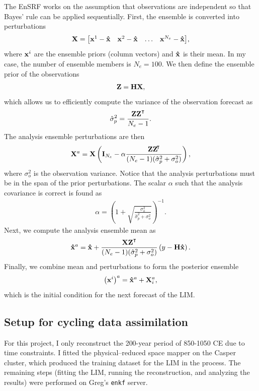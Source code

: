 \documentclass[parskip=half,DIV=16]{scrartcl}
\begin{document}
The \gls{EnSRF} works on the assumption that observations are independent so that Bayes' rule can be applied sequentially. First, the ensemble is converted into perturbations
\begin{align*}
    \vb{X} = \mqty[ \vb{x}^{1} - \vu{x} &  \vb{x}^{2} - \vu{x} & \ldots &  \vb{x}^{N_e} - \vu{x} ],
\end{align*}
where $\vb{x}^i$ are the ensemble priors (column vectors) and $\vu{x}$ is their mean. In my case, the number of ensemble members is $N_e = 100$. We then define the ensemble prior of the observations
\begin{align*}
    \vb{Z} = \vb{H} \vb{X},
\end{align*}
which allows us to efficiently compute the variance of the observation forecast as
\begin{align*}
    \hat{\sigma}_p^2 = \frac{\vb{Z} \vb{Z}^\transpose}{N_e-1}.
\end{align*}
The analysis ensemble perturbations are then
\begin{align*}
    \vb{X}^a = \vb{X} \left( \vb{I}_{N_e} - \alpha \frac{\vb{Z} \vb{Z}^\transpose*}{(N_e-1)(\hat{\sigma}_p^2 + \sigma_o^2)} \right),
\end{align*}
where $\sigma_o^2$ is the observation variance. Notice that the analysis perturbations must be in the span of the prior perturbations. The scalar $\alpha$ such that the analysis covariance is correct is found as
\begin{align*}
    \alpha = \left( 1 + \sqrt{\frac{\sigma_o^2}{\hat{\sigma}_p^2 + \sigma_o^2}} \right)^{-1}.
\end{align*}
Next, we compute the analysis ensemble mean as
\begin{align*}
    \vu{x}^a = \vu{x} + \frac{\vb{X}\vb{Z}^\transpose}{(N_e-1)(\hat{\sigma}_p^2 + \sigma_o^2)} \left( y - \vb{H} \vu{x} \right).
\end{align*}
Finally, we combine mean and perturbations to form the posterior ensemble
\begin{align*}
    \left(\vb{x}^i\right)^a = \vu{x}^a + \vb{X}^a_i,
\end{align*}
which is the initial condition for the next forecast of the \gls{LIM}.




\subsection{Setup for cycling data assimilation}

For this project, I only reconstruct the 200-year period of 850-1050 CE due to time constraints. I fitted the physical--reduced space mapper on the Casper cluster, which produced the training dataset for the \gls{LIM} in the process. The remaining steps (fitting the \gls{LIM}, running the reconstruction, and analyzing the results) were performed on Greg's \texttt{enkf} server.
\end{document}
